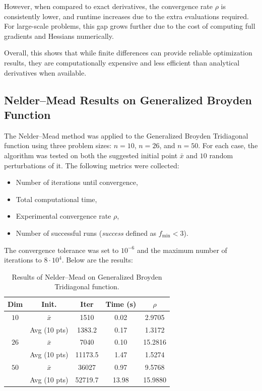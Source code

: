 \documentclass[a4paper,12pt]{article}
\begin{document}
	However, when compared to exact derivatives, the convergence rate \( \rho \) is consistently lower, and runtime increases due to the extra evaluations required. For large-scale problems, this gap grows further due to the cost of computing full gradients and Hessians numerically.
	
	Overall, this shows that while finite differences can provide reliable optimization results, they are computationally expensive and less efficient than analytical derivatives when available.
	\newpage
	
	\subsection{Nelder–Mead Results on Generalized Broyden Function}
	
	The Nelder–Mead method was applied to the Generalized Broyden Tridiagonal function using three problem sizes: $n = 10$, $n = 26$, and $n = 50$. For each case, the algorithm was tested on both the suggested initial point $\bar{x}$ and $10$ random perturbations of it. The following metrics were collected:
	\begin{itemize}[noitemsep]
		\item Number of iterations until convergence,
		\item Total computational time,
		\item Experimental convergence rate $\rho$,
		\item Number of successful runs (\emph{success} defined as $f_{\min} < 3$).
	\end{itemize}
	
	The convergence tolerance was set to $10^{-6}$ and the maximum number of iterations to $8 \cdot 10^4$. Below are the results:
	
	\begin{table}[htbp]
		\centering
		\caption{Results of Nelder–Mead on Generalized Broyden Tridiagonal function.}
		\renewcommand{\arraystretch}{1.2}
		\begin{tabular}{|c|c|c|c|c|}
			\hline
			\textbf{Dim} & \textbf{Init.} & \textbf{Iter} & \textbf{Time (s)} & \textbf{$\rho$} \\
			\hline
			$10$   & $\bar{x}$       & 1510   & 0.02 & 2.9705 \\
			& Avg (10 pts)    & 1383.2 & 0.17 & 1.3172 \\
			\hline
			$26$   & $\bar{x}$       & 7040   & 0.10 & 15.2816 \\
			& Avg (10 pts)    & 11173.5 & 1.47 & 1.5274 \\
			\hline
			$50$   & $\bar{x}$       & 36027  & 0.97 & 9.5768 \\
			& Avg (10 pts)    & 52719.7 & 13.98 & 15.9880 \\
			\hline
		\end{tabular}
		\label{tab:neldermead_generalized_broyden}
	\end{table}
	
\end{document}
